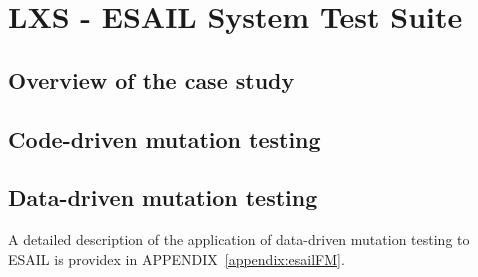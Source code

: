 
\section{LXS - ESAIL System Test Suite}
\label{chapter:caseStudies:LXS}

\subsection{Overview of the case study}

\subsection{Code-driven mutation testing}

\subsection{Data-driven mutation testing}

A detailed description of the application of data-driven mutation testing to ESAIL is providex in APPENDIX~\ref{appendix:esailFM}.


